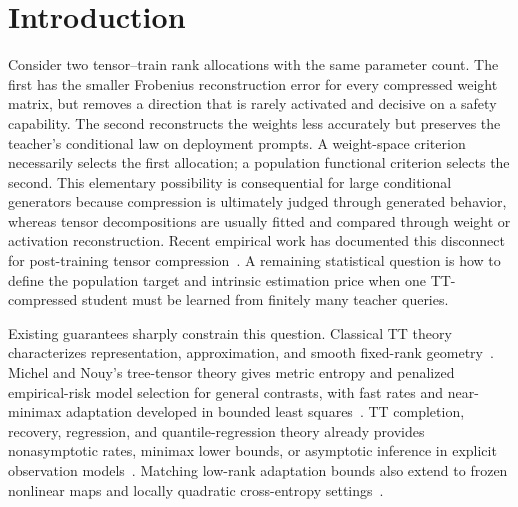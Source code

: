 \section{Introduction}
\label{sec:intro}

Consider two tensor--train rank allocations with the same parameter count. The first has the smaller Frobenius reconstruction error for every compressed weight matrix, but removes a direction that is rarely activated and decisive on a safety capability. The second reconstructs the weights less accurately but preserves the teacher's conditional law on deployment prompts. A weight-space criterion necessarily selects the first allocation; a population functional criterion selects the second. This elementary possibility is consequential for large conditional generators because compression is ultimately judged through generated behavior, whereas tensor decompositions are usually fitted and compared through weight or activation reconstruction. Recent empirical work has documented this disconnect for post-training tensor compression~\citep{zagitov2026rethinking,swiftsvd2026}. A remaining statistical question is how to define the population target and intrinsic estimation price when one TT-compressed student must be learned from finitely many teacher queries.

Existing guarantees sharply constrain this question. Classical TT theory characterizes representation, approximation, and smooth fixed-rank geometry~\citep{oseledets2011tt,holtz2012manifolds}. Michel and Nouy's tree-tensor theory gives metric entropy and penalized empirical-risk model selection for general contrasts, with fast rates and near-minimax adaptation developed in bounded least squares~\citep{michel2022tree}. TT completion, recovery, regression, and quantile-regression theory already provides nonasymptotic rates, minimax lower bounds, or asymptotic inference in explicit observation models~\citep{imaizumi2017ttrank,zhou2022ttoi,qinwakin2024ttrecovery,qin2024ttregression,liu2024ttquantile,peng2025ttregression}. Matching low-rank adaptation bounds also extend to frozen nonlinear maps and locally quadratic cross-entropy settings~\citep{arunan2026lora}.

